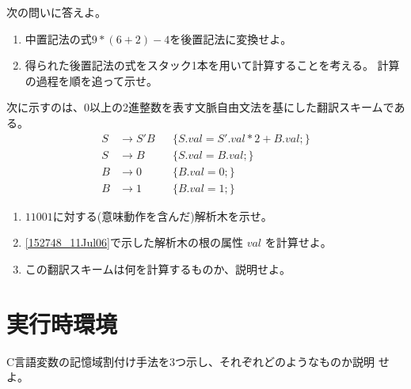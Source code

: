 \begin{exercise}
 次の問いに答えよ。
 \begin{enumerate}
  \item 中置記法の式$9*(6+2)-4$を後置記法に変換せよ。
  \item 得られた後置記法の式をスタック1本を用いて計算することを考える。
	計算の過程を順を追って示せ。
 \end{enumerate}
\end{exercise}
\begin{exercise}
 次に示すのは、0以上の2進整数を表す文脈自由文法を基にした翻訳スキームである。
  \begin{align*}
   S & \rightarrow S' B && \{ S.val = S'.val * 2 + B.val; \}\\
   S & \rightarrow B && \{ S.val = B.val; \}\\
   B & \rightarrow 0 && \{ B.val = 0; \}\\
   B & \rightarrow 1 && \{ B.val = 1; \}
  \end{align*}
 \begin{enumerate}
  \item $11001$に対する(意味動作を含んだ)解析木を示せ。
	\label{152748_11Jul06}
  \item \ref{152748_11Jul06}で示した解析木の根の属性 $val$ を計算せよ。
  \item この翻訳スキームは何を計算するものか、説明せよ。
 \end{enumerate}
\end{exercise}

\section{実行時環境}

\begin{exercise}
 C言語変数の記憶域割付け手法を3つ示し、それぞれどのようなものか説明
 せよ。
\end{exercise}
